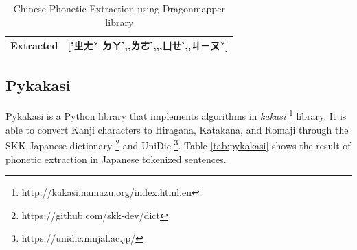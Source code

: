 \begin{table}[h]
        \begin{CJK}{UTF8}{bsmi}
        \begin{tabular}{p{2.3cm}p{12cm}}
            Extracted & ['ㄓㄤˇ ㄉㄚˋ,, ㄌㄜˋ,\enspace,, ㄩㄝˋ,, ㄐㄧㄡˇ] \\\bottomrule
        \end{tabular}
        \end{CJK}

        \caption{Chinese Phonetic Extraction using Dragonmapper library}
        \label{tab:dragonmapper}
    \end{table}

\subsection{Pykakasi} \label{sec:pykakasi}

Pykakasi is a Python library that implements algorithms in \textit{kakasi} \footnote{http://kakasi.namazu.org/index.html.en} library. It is able to convert Kanji characters to Hiragana, Katakana, and Romaji through the SKK Japanese dictionary \footnote{https://github.com/skk-dev/dict} and UniDic \footnote{https://unidic.ninjal.ac.jp/}. Table \ref{tab:pykakasi} shows the result of phonetic extraction in Japanese tokenized sentences. 

\vspace{0.2cm}

